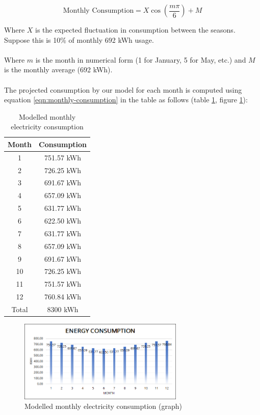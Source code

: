 \documentclass[10pt,letterpaper]{article}
\begin{document}
\begin{equation}
	\text{Monthly Consumption}=X\cos\left(\frac{m\pi}{6}\right)+M
	\label{eqn:monthly-consumption}
\end{equation}

Where $X$ is the expected fluctuation in consumption between the seasons. Suppose this is 10\% of monthly 692 kWh usage.\\
\\
Where $m$ is the month in numerical form (1 for January, 5 for May, etc.) and $M$ is the monthly average (692 kWh).\\
\\
The projected consumption by our model for each month is computed using equation \ref{eqn:monthly-consumption} in the table as follows (table \ref{table:consumption-table}, figure \ref{fig:consumption-graph}):

\begin{table}[H]
	\centering
	\begin{tabular}{ |c|c| }
		\hline
		Month & Consumption\\
		\hline
		1 & 751.57 kWh\\
		2 & 726.25 kWh\\
		3 & 691.67 kWh\\
		4 & 657.09 kWh\\
		5 & 631.77 kWh\\
		6 & 622.50 kWh\\
		7 & 631.77 kWh\\
		8 & 657.09 kWh\\
		9 & 691.67 kWh\\
		10 & 726.25 kWh\\
		11 & 751.57 kWh\\
		12 & 760.84 kWh\\
		\hline
		Total & 8300 kWh\\
		\hline
	\end{tabular}
	\caption{Modelled monthly electricity consumption}
	\label{table:consumption-table}
\end{table}

\begin{figure}[H]
	\centering
	\includegraphics[width=0.7\textwidth]{assets/1534567555536}
	\caption{Modelled monthly electricity consumption (graph)}
	\label{fig:consumption-graph}
\end{figure}
\end{document}
